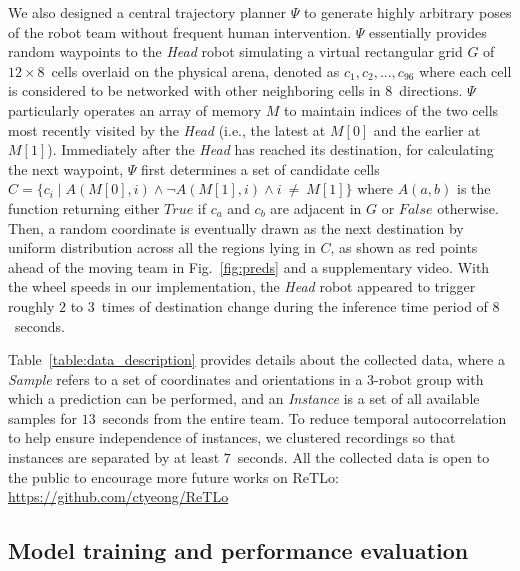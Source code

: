 \documentclass[letterpaper, 10 pt, conference]{ieeeconf}  %
\begin{document}
    
    We also designed a central trajectory planner $\Psi$ to generate highly 
    arbitrary poses of the robot team without frequent human intervention.
    $\Psi$ essentially provides random waypoints to the \emph{Head} robot simulating a virtual 
    rectangular grid $G$ of $12 \times 8$~cells overlaid on the physical arena,  
    denoted as $c_1, c_2, ..., c_{96}$ where each cell is considered to be networked 
    with other neighboring cells in $8$~directions. 
    $\Psi$ particularly operates an array of memory $M$ to maintain indices of 
    the two cells most recently visited by the \emph{Head} 
    (i.e., the latest at $M[0]$ and the earlier at $M[1]$). 
    Immediately after the \emph{Head} has reached its destination, 
    for calculating the next waypoint, $\Psi$ first determines a set of candidate
    cells $C = \{c_i \mid A(M[0],i) \wedge \neg A(M[1],i) \wedge i~\neq~M[1] \}$ 
	where $A(a,b)$ is the function returning either $True$ if $c_a$ 
	and $c_b$ are adjacent in $G$ or $False$ otherwise. 
    Then, a random coordinate is eventually drawn as the next destination by uniform
    distribution across all the regions lying in $C$, 
    as shown as red points ahead of the moving team in Fig.~\ref{fig:preds} and 
    a supplementary video. 
    With the wheel speeds in our implementation, 
    the \emph{Head} robot appeared to trigger roughly $2$ to $3$~times of destination 
    change during the inference time period of $8$~seconds.
    
    Table~\ref{table:data_description} provides details about the
    collected data, where a \emph{Sample} refers to a set of coordinates and
    orientations in a 3-robot group with which a prediction can be
    performed, and an \emph{Instance} is a set of all available samples
    for $13$~seconds from the entire team. To reduce temporal
    autocorrelation to help ensure independence of instances, we
    clustered recordings so that instances are separated by at least
    $7$~seconds. All the collected data is open to the 
    public to encourage more future works on ReTLo:
    \url{https://github.com/ctyeong/ReTLo}
   
    \subsection{Model training and performance evaluation}
\end{document}

